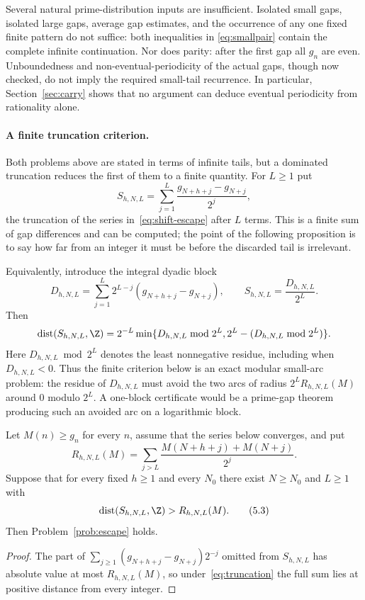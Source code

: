 \documentclass[11pt]{article}
\begin{document}
Several natural prime-distribution inputs are insufficient.  Isolated
small gaps, isolated large gaps, average gap estimates, and the occurrence of
any one fixed finite pattern do not suffice: both inequalities in
\eqref{eq:smallpair} contain the complete infinite continuation.  Nor
does parity: after the first gap all $g_n$ are even.  Unboundedness and
non-eventual-periodicity of the actual gaps, though now checked, do not imply
the required small-tail recurrence.  In particular, Section~\ref{sec:carry}
shows that no argument can deduce eventual periodicity from rationality alone.

\paragraph{A finite truncation criterion.}
Both problems above are stated in terms of infinite tails, but a dominated
truncation reduces the first of them to a finite quantity.  For $L\ge1$ put
\[
 S_{h,N,L}=\sum_{j=1}^{L}
 \frac{g_{N+h+j}-g_{N+j}}{2^j},
\]
the truncation of the series in~\eqref{eq:shift-escape} after $L$ terms.  This
is a finite sum of gap differences and can be computed; the point of the
following proposition is to say how far from an integer it must be before the
discarded tail is irrelevant.

Equivalently, introduce the integral dyadic block
\[
 D_{h,N,L}=\sum_{j=1}^{L}2^{L-j}
   (g_{N+h+j}-g_{N+j}),\qquad S_{h,N,L}=\frac{D_{h,N,L}}{2^L}.
\]
Then
\[
 \operatorname{dist}(S_{h,N,L},\Z)
 =2^{-L}\min\{D_{h,N,L}\bmod2^L,
 2^L-(D_{h,N,L}\bmod2^L)\}.
\]
Here $D_{h,N,L}\bmod2^L$ denotes the least nonnegative residue, including
when $D_{h,N,L}<0$.
Thus the finite criterion below is an exact modular small-arc problem: the
residue of $D_{h,N,L}$ must avoid the two arcs of radius
$2^LR_{h,N,L}(M)$ around $0$ modulo $2^L$.  A one-block certificate would be a
prime-gap theorem producing such an avoided arc on a logarithmic block.

\begin{proposition}\label{res:truncation}
Let $M(n)\ge g_n$ for every $n$, assume that the series below converges, and
put
\[
 R_{h,N,L}(M)=
 \sum_{j>L}\frac{M(N+h+j)+M(N+j)}{2^j}.
\]
Suppose that for every fixed $h\ge1$ and every $N_0$ there exist $N\ge N_0$ and
$L\ge1$ with
\[
 \operatorname{dist}(S_{h,N,L},\Z)>R_{h,N,L}(M).
\tag{5.3}\label{eq:truncation}
\]
Then Problem~\ref{prob:escape} holds.
\end{proposition}

\begin{proof}
The part of $\sum_{j\ge1}(g_{N+h+j}-g_{N+j})2^{-j}$ omitted from $S_{h,N,L}$
has absolute value at most $R_{h,N,L}(M)$, so under~\eqref{eq:truncation} the
full sum lies at positive distance from every integer.
\end{proof}
\end{document}
